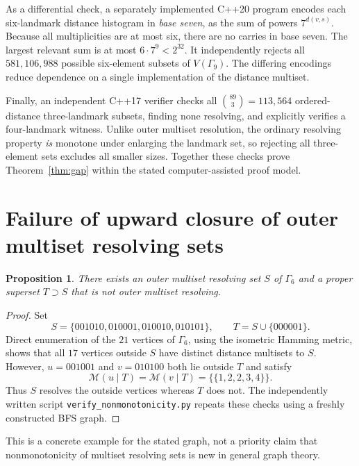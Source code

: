 \documentclass[10pt,a4paper]{article}
\newtheorem{proposition}[theorem]{Proposition}
\newcommand{\G}{\Gamma}
\newcommand{\rep}{\mathcal{M}}
\begin{document}
As a differential check, a separately implemented C++20 program encodes each six-landmark
distance histogram in \emph{base seven}, as the sum of powers $7^{d(v,s)}$.
Because all multiplicities are at most six, there are no carries in base seven.
The largest relevant sum is at most $6\cdot7^9<2^{32}$.
It independently rejects all $581{,}106{,}988$ possible six-element subsets of $V(\G_9)$.
The differing encodings reduce dependence on a single implementation of the distance multiset.

Finally, an independent C++17 verifier checks all $\binom{89}{3}=113{,}564$ ordered-distance
three-landmark subsets, finding none resolving, and explicitly verifies a four-landmark
witness. Unlike outer multiset resolution, the ordinary resolving property \emph{is}
monotone under enlarging the landmark set, so rejecting all three-element sets excludes
all smaller sizes. Together these checks prove Theorem~\ref{thm:gap} within the stated
computer-assisted proof model.

\section{Failure of upward closure of outer multiset resolving sets}
\begin{proposition}\label{prop:nonmono}
There exists an outer multiset resolving set $S$ of $\G_6$ and a proper superset
$T\supset S$ that is not outer multiset resolving.
\end{proposition}
\begin{proof}
Set
\[
S=\{001010,010001,010010,010101\},\qquad
T=S\cup\{000001\}.
\]
Direct enumeration of the $21$ vertices of $\G_6$, using the isometric Hamming metric,
shows that all $17$ vertices outside $S$ have distinct distance multisets to $S$.
However, $u=001001$ and $v=010100$ both lie outside $T$ and satisfy
\[
\rep(u\mid T)=\rep(v\mid T)=\{\!\{1,2,2,3,4\}\!\}.
\]
Thus $S$ resolves the outside vertices whereas $T$ does not.
The independently written script \texttt{verify\_nonmonotonicity.py} repeats these checks
using a freshly constructed BFS graph.
\end{proof}
This is a concrete example for the stated graph, not a priority claim that
nonmonotonicity of multiset resolving sets is new in general graph theory.
\end{document}
